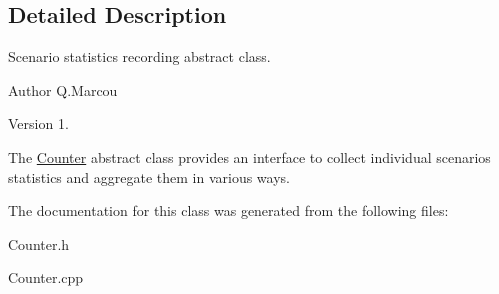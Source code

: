 \subsection{Detailed Description}
Scenario statistics recording abstract class. 

\begin{DoxyAuthor}{Author}
Q.\+Marcou 
\end{DoxyAuthor}
\begin{DoxyVersion}{Version}
1.
\end{DoxyVersion}
The \hyperlink{classCounter}{Counter} abstract class provides an interface to collect individual scenarios statistics and aggregate them in various ways. 

The documentation for this class was generated from the following files\+:\begin{DoxyCompactItemize}
\item 
Counter.\+h\item 
Counter.\+cpp\end{DoxyCompactItemize}

